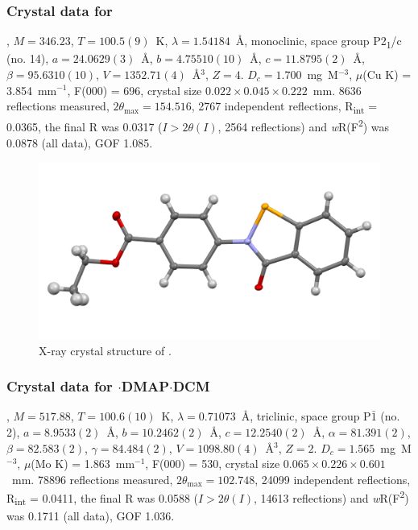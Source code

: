 \begin{refsection}
\subsubsection{Crystal data for \texorpdfstring{}{C16 H13 N O3 Se}}
, $M=346.23$, $T=100.5(9)$~K, $\lambda=1.54184$~\AA, monoclinic, space group P2\textsubscript{1}/c (no. 14), $a = 24.0629(3)$~\AA, $b = 4.75510(10)$~\AA, $c = 11.8795(2)$~\AA, $\beta = 95.6310(10)$\degree, $V = 1352.71(4)$~\AA$^{3}$, $Z = 4$. $D_{c}= 1.700$~mg~M$^{-3}$, $\mu$(Cu K\a) = 3.854~mm$^{-1}$, F(000) = 696, crystal size $0.022 \times 0.045 \times 0.222$~mm. 8636 reflections measured, $2\theta_{\mathrm{max}}=154.516$\degree, 2767 independent reflections, R\textsubscript{int} = 0.0365, the final R was 0.0317 ($I > 2\theta(I)$, 2564 reflections) and \emph{w}R(F\textsuperscript{2}) was 0.0878 (all data), GOF 1.085.

\begin{figure}
  \includegraphics[width=0.6\linewidth]{Figures/ebs-4co2et-xtal.pdf}
  \caption{X-ray crystal structure of \texorpdfstring{}{C16 H13 N O3 Se}.}
\end{figure}

\subsubsection{Crystal data for \texorpdfstring{$\cdot$DMAP$\cdot$DCM}{C24 H25 Cl N3 O3 Se}}
, $M=517.88$, $T=100.6(10)$~K, $\lambda=0.71073$~\AA, triclinic, space group P$\bar{1}$ (no. 2), $a = 8.9533(2)$~\AA, $b = 10.2462(2)$~\AA, $c = 12.2540(2)$~\AA, $\alpha = 81.391(2)$\degree, $\beta = 82.583(2)$\degree, $\gamma = 84.484(2)$\degree, $V = 1098.80(4)$~\AA$^{3}$, $Z = 2$. $D_{c}= 1.565$~mg~M$^{-3}$, $\mu$(Mo K\a) = 1.863~mm$^{-1}$, F(000) = 530, crystal size $0.065 \times 0.226 \times 0.601$~mm. 78896 reflections measured, $2\theta_{\mathrm{max}}=102.748$\degree, 24099 independent reflections, R\textsubscript{int} = 0.0411, the final R was 0.0588 ($I > 2\theta(I)$, 14613 reflections) and \emph{w}R(F\textsuperscript{2}) was 0.1711 (all data), GOF 1.036.


\end{refsection}
